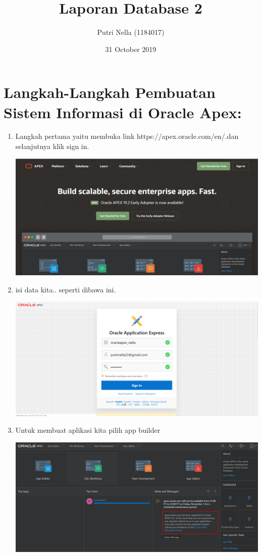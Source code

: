 \documentclass{article}
\title{Laporan Database 2}
\author{Putri Nella (1184017)}
\date{31 October 2019}
\begin{document}
\maketitle

\section{Langkah-Langkah Pembuatan Sistem Informasi di Oracle Apex:}
\begin{enumerate}
    \item Langkah pertama yaitu membuka link https://apex.oracle.com/en/.dan selanjutnya klik sign in.
  \begin{center}
    \includegraphics[width=.8\textwidth]{1.PNG}
\end{center}
    \item isi data kita.. seperti dibawa ini.
    \begin{center}
    \includegraphics[width=.8\textwidth]{2.PNG}
\end{center}
    \item Untuk membuat aplikasi kita pilih app builder
    \begin{center}
    \includegraphics[width=.8\textwidth]{3.PNG}

\end{center}
\end{enumerate}
\end{document}
